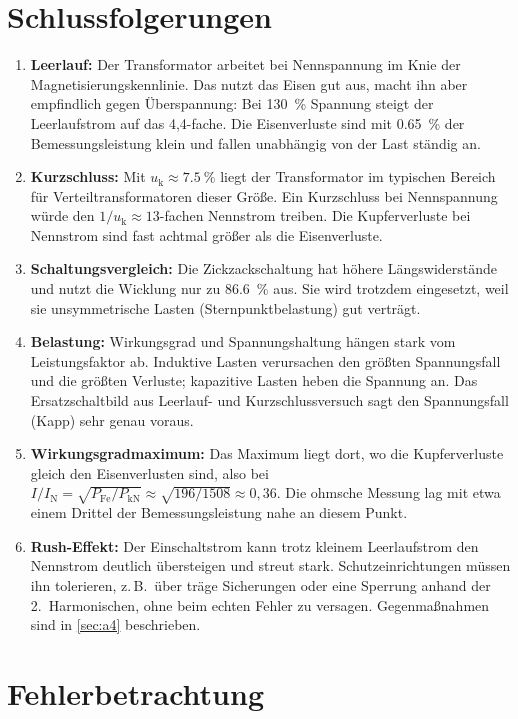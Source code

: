 \documentclass[a4paper,11pt]{scrreprt}
\begin{document}
\section{Schlussfolgerungen}

\begin{enumerate}
  \item \textbf{Leerlauf:} Der Transformator arbeitet bei Nennspannung im Knie der Magnetisierungskennlinie. Das nutzt das Eisen gut aus, macht ihn aber empfindlich gegen Überspannung: Bei \SI{130}{\percent} Spannung steigt der Leerlaufstrom auf das 4,4-fache. Die Eisenverluste sind mit \SI{0.65}{\percent} der Bemessungsleistung klein und fallen unabhängig von der Last ständig an.
  \item \textbf{Kurzschluss:} Mit $u_\mathrm{k}\approx\SI{7.5}{\percent}$ liegt der Transformator im typischen Bereich für Verteiltransformatoren dieser Größe. Ein Kurzschluss bei Nennspannung würde den $1/u_\mathrm{k}\approx 13$-fachen Nennstrom treiben. Die Kupferverluste bei Nennstrom sind fast achtmal größer als die Eisenverluste.
  \item \textbf{Schaltungsvergleich:} Die Zickzackschaltung hat höhere Längswiderstände und nutzt die Wicklung nur zu \SI{86.6}{\percent} aus. Sie wird trotzdem eingesetzt, weil sie unsymmetrische Lasten (Sternpunktbelastung) gut verträgt.
  \item \textbf{Belastung:} Wirkungsgrad und Spannungshaltung hängen stark vom Leistungsfaktor ab. Induktive Lasten verursachen den größten Spannungsfall und die größten Verluste; kapazitive Lasten heben die Spannung an. Das Ersatzschaltbild aus Leerlauf- und Kurzschlussversuch sagt den Spannungsfall (Kapp) sehr genau voraus.
  \item \textbf{Wirkungsgradmaximum:} Das Maximum liegt dort, wo die Kupferverluste gleich den Eisenverlusten sind, also bei $I/I_\mathrm{N}=\sqrt{P_\mathrm{Fe}/P_\mathrm{kN}}\approx\sqrt{196/1508}\approx 0{,}36$. Die ohmsche Messung lag mit etwa einem Drittel der Bemessungsleistung nahe an diesem Punkt.
  \item \textbf{Rush-Effekt:} Der Einschaltstrom kann trotz kleinem Leerlaufstrom den Nennstrom deutlich übersteigen und streut stark. Schutzeinrichtungen müssen ihn tolerieren, z.\,B.\ über träge Sicherungen oder eine Sperrung anhand der 2.~Harmonischen, ohne beim echten Fehler zu versagen. Gegenmaßnahmen sind in \cref{sec:a4} beschrieben.
\end{enumerate}

\section{Fehlerbetrachtung}
\end{document}
